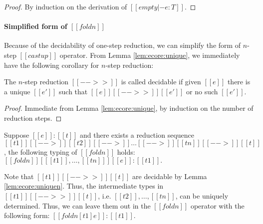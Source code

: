 \begin{proof}
    By induction on the derivation of $[[empty |- e:T]]$.
\end{proof}

\paragraph{Simplified form of $[[foldn]]$}
Because of the decidability of one-step reduction, we can simplify the form of 
$n$-step $[[castup]]$ operator. From Lemma \ref{lem:ecore:unique}, 
we immediately have the following corollary for $n$-step reduction:

\begin{lem}\label{lem:ecore:uniquen}
    The $n$-step reduction $[[-->>]]$ is called decidable if 
    given $[[e]]$ there is a unique $[[e']]$ such that $[[e]] [[-->>]] [[e']]$ or no such $[[e']]$.
\end{lem}

\begin{proof}
    Immediate from Lemma \ref{lem:ecore:unique}, by induction on the number of
reduction steps.
\end{proof}

Suppose $[[e]] : [[t]]$ and there exists a reduction sequence
$[[t1]] [[-->]] [[t2]] [[-->]] \dots [[-->]] [[tn]] [[-->]] [[t]]$,
the following typing of $[[foldn]]$ holds:
$
    [[foldn]] [ [[t1]], \dots, [[tn]] ] [[e]] : [[t1]].
$

Note that $[[t1]] [[-->>]] [[t]]$ are decidable by Lemma
\ref{lem:ecore:uniquen}. Thus, the intermediate types in $[[t1]] [[-->>]] [[t]]$,
i.e. $[[t2]], \dots, [[tn]]$, can be uniquely determined. Thus, we can leave
them out in the $[[foldn]]$ operator with the following form:
$
    [[foldn [t1] e]] : [[t1]].
$
